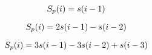 \documentclass{article}
\begin{document}
\begin{equation}
S_p(i) = s(i-1) \\
\end{equation}

\begin{equation}
S_p(i) = 2s(i-1) - s(i-2) \\
\end{equation}

\begin{equation}
S_p(i) = 3s(i-1) - 3s(i-2) + s(i-3) \\
\end{equation}





\cite{makhoul1975linear}





\end{document}
